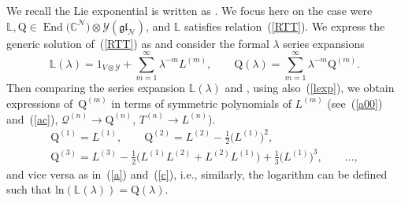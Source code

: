 \documentclass[pdftex]{sigma}
\numberwithin{equation}{section}
\newcommand{\lb}{\left(}
\newcommand{\rb}{\right)}
\theoremstyle{definition}
\DeclareMathOperator{\EEnd}{End}%
\renewcommand{\ln}[1]{\text{ln} \lb #1 \rb}
\begin{document}
We recall the Lie exponential is written as .
We focus here on the case were ${\mathbb L}, {\mathrm Q} \in \EEnd\bigl({\mathbb C}^{\mathcal N}\bigr)
\otimes {\mathcal Y}(\mathfrak{gl}_{\mathcal N})$, and ${\mathbb L}$ satisfies relation~(\ref{RTT}).
We express the generic solution of~(\ref{RTT}) as 
and consider the formal $\lambda$ series expansions
\begin{equation}
{\mathbb L}(\lambda) = 1_{V \otimes {\mathcal Y}}+ \sum_{m=1}^{\infty}\lambda^{-m} L^{(m)},
\qquad {\mathrm Q}(\lambda) = \sum_{m=1}^{\infty}\lambda^{-m} {\mathrm Q}^{(m)}. \label{lexp}
\end{equation}
Then comparing the series expansion ${\mathbb L}(\lambda)$ and , using also~(\ref{lexp}),
we obtain expressions of~${\mathrm Q}^{(m)}$ in terms of symmetric polynomials of $L^{(m)}$ \big(see~(\ref{a00}) and~(\ref{ac}), ${{\mathcal Q}^{(n)}\! \to\! {\mathrm Q}^{(n)}}$, ${T^{(n)}\! \to\! L^{(n)} }$\big).
\begin{gather}
{\mathrm Q}^{(1)} = L^{(1)}, \qquad {\mathrm Q}^{(2)} = L^{(2)} -\frac{1}{2} \bigl(L^{(1)}\bigr)^2, \label{a0} \\
{\mathrm Q}^{(3)} = L^{(3)} - \frac{1}{2} \bigl( L^{(1)} L^{(2)} + L^{(2)} L^{(1)}\bigr) +\frac{1}{3} \bigl(L^{(1)}\bigr)^3, \qquad\dots, \label{acd}
\end{gather}
and vice versa as in~(\ref{a}) and~(\ref{c}), i.e., similarly, the logarithm can be defined such that $\ln{{\mathbb L}(\lambda)}= {\mathrm Q}(\lambda)$.
\end{document}
